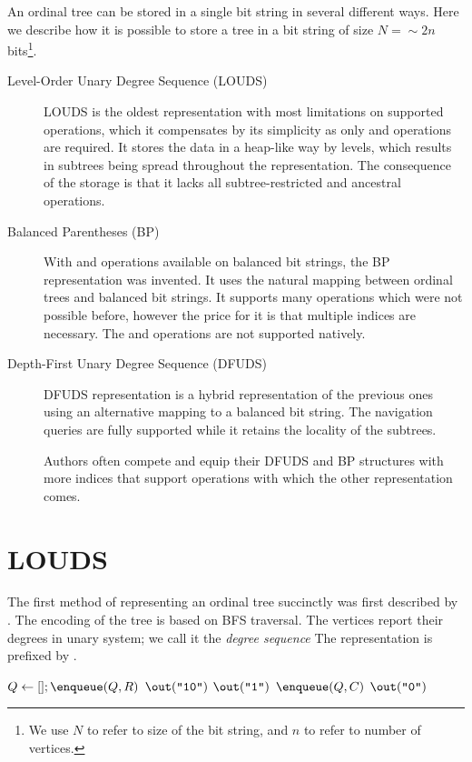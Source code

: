 An ordinal tree can be stored in a single bit string in several different ways.
Here we describe how it is possible to store a tree in a bit string of size $N = \sim 2n$ bits\footnote{
	We use $N$ to refer to size of the bit string, and $n$ to refer to number of vertices.
}.
\begin{description}
	\item[Level-Order Unary Degree Sequence (LOUDS)]
	LOUDS is the oldest representation with most limitations on supported operations, which it compensates by its simplicity as only \rank{} and \select{} operations are required.
	It stores the data in a heap-like way by levels, which results in subtrees being spread throughout the representation.
	The consequence of the storage is that it lacks all subtree-restricted and ancestral operations.
	
	\item[Balanced Parentheses (BP)]
	With \match{} and \enclose{} operations available on balanced bit strings, the BP representation was invented.
	It uses the natural mapping between ordinal trees and balanced bit strings.
	It supports many operations which were not possible before, however the price for it is that multiple indices are necessary.
	The \childRank{} and \childSelect{} operations are not supported natively.
	
	\item[Depth-First Unary Degree Sequence (DFUDS)]
	DFUDS representation is a hybrid representation of the previous ones using an alternative mapping to a balanced bit string.
	The navigation queries are fully supported while it retains the locality of the subtrees.
	
	Authors often compete and equip their DFUDS and BP structures with more indices that support operations with which the other representation comes.
\end{description}

\section{LOUDS}

The first method of representing an ordinal tree succinctly was first described by \cite{jacobson1989space}.
The encoding of the tree is based on BFS traversal.
The vertices report their degrees in unary system; we call it the \emph{degree sequence}
The representation is prefixed by .

\begin{algorithmic}
	\State $Q \gets []; \enqueue(Q, R)$ 
	\State $\out(\str{10})$
			\State $\out(\str1)$
			\State $\enqueue(Q, C)$
		\EndFor
		\State $\out(\str0)$
	\EndWhile
\EndFunction
\end{algorithmic}


